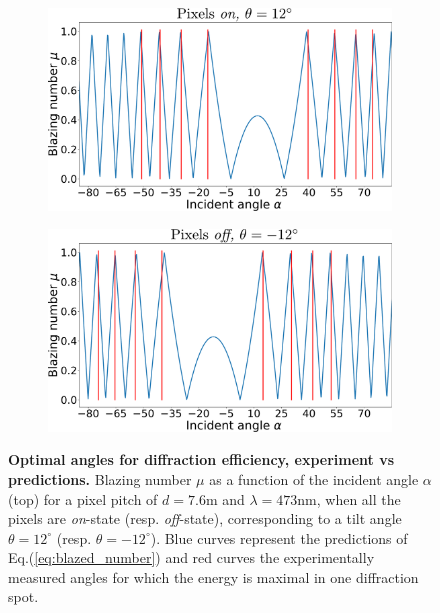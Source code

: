 \documentclass[12pt]{iopart}
\begin{document}
\begin{figure}
  \centering
  \begin{subfigure}{0.8\textwidth}
    \centering
    \includegraphics[width = \textwidth]{images/theo_VS_exp_diffraction.pdf}
  \end{subfigure}
  \begin{subfigure}{0.8\textwidth}
    \centering
    \includegraphics[width = \textwidth]{images/theo_VS_exp_diffraction_off.pdf}
  \end{subfigure}
  \caption{
    \textbf{Optimal angles for diffraction efficiency, experiment vs predictions.}
     Blazing number $\mu$ as a function of the incident angle $\alpha$  (top)
    for a pixel pitch of $d=7.6$\textmu m
    and $\lambda = 473\text{nm}$, 
    when all the pixels are \textit{on}-state (resp. \textit{off}-state), 
    corresponding to a tilt angle $\theta=12^\circ$ (resp. $\theta=-12^\circ$).
    Blue curves represent the predictions of Eq.(\ref{eq:blazed_number}) 
    and red curves the experimentally measured angles for which the 
    energy is maximal in one diffraction spot.
  }
  \label{fig:exp_vs_theo}
\end{figure}
\end{document}
